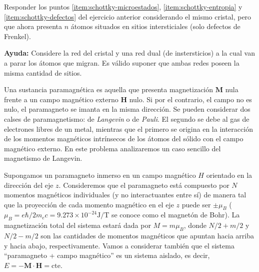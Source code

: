 \documentclass[a4paper,11pt]{article}
\newcounter{exercise}
\newcommand{\exercisetitle}[1]{
    \stepcounter{exercise}
    \vspace{1em}
    \noindent{
        \textbf{Problema \theexercise . #1}
        \vspace{0.5em}
    }
}
\begin{document}
Responder los puntos \ref{item:schottky-microestados}, 
\ref{item:schottky-entropia} y \ref{item:schottky-defectos} del 
ejercicio anterior considerando el mismo cristal, pero que ahora 
presenta $n$ átomos situados en sitios intersticiales (solo defectos de 
Frenkel).

\vspace{0.5em}
{\small
\textbf{Ayuda:} Considere la red del cristal y una red dual (de 
instersticios) a la cual van a parar los átomos que migran. Es válido 
suponer que ambas redes poseen la misma cantidad de sitios.
}



\exercisetitle{Paramagneto}

Una sustancia paramagnética es aquella que presenta magnetización 
$\mathbf{M}$ nula frente a un campo magnético externo $\mathbf{H}$ 
nulo.
Si por el contrario, el campo no es nulo, el paramagneto se 
imanta en la misma dirección. Se pueden considerar dos calses de 
paramagnetismo: de \emph{Langevin} o de \emph{Pauli}.
El segundo se debe al gas de electrones libres de un metal, mientras 
que el primero se origina en la interacción de los momentos magnéticos 
intrínsecos de los átomos del sólido con el campo magnético externo.
En este problema analizaremos un caso sencillo del magnetismo de 
Langevin.

Supongamos un paramagneto inmerso en un campo magnético $H$ 
orientado en la dirección del eje $z$.
Consideremos que el paramagneto está compuesto por $N$ momentos 
magnéticos individuales (y no interactuantes entre sí) de manera tal 
que la proyección de cada momento magnético en el eje $z$ 
puede ser $\pm \mu_B$ ($\mu_B = e\hbar / 2m_e c = 9.273 \times 
10^{-24} \text{J/T}$ se conoce como el magnetón de Bohr).
La magnetización total del sistema estará dada por $M = m \mu_B$, donde 
$N/2 + m/2$ y $N/2 - m/2$ son las cantidades de momentos magnéticos que 
apuntan hacia arriba y hacia abajo, respectivamente.
Vamos a considerar también que el sistema ``paramagneto + campo 
magnético'' es un sistema aislado, es decir, $E = - 
\mathbf{M}\cdot\mathbf{H} = \text{cte}$.
\end{document}
